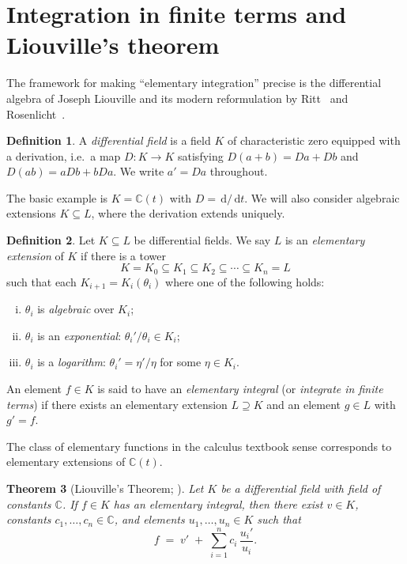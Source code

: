 \documentclass[11pt,a4paper]{article}
\theoremstyle{plain}
\newtheorem{theorem}{Theorem}[section]
\theoremstyle{definition}
\newtheorem{definition}[theorem]{Definition}
\theoremstyle{remark}
\newcommand{\C}{\mathbb{C}}
\renewcommand{\d}{\,\mathrm{d}}
\begin{document}
\section{Integration in finite terms and Liouville's theorem}
\label{sec:liouville}

The framework for making ``elementary integration'' precise is the differential algebra of Joseph Liouville and its modern reformulation by Ritt~\cite{Ritt1948} and Rosenlicht~\cite{Rosenlicht1972}.

\begin{definition}\label{def:diffield}
A \emph{differential field} is a field $K$ of characteristic zero equipped with a derivation, i.e.\ a map $D \colon K \to K$ satisfying $D(a+b)=Da+Db$ and $D(ab)=aDb+bDa$. We write $a' = Da$ throughout.
\end{definition}

The basic example is $K = \C(t)$ with $D = \d/\d t$. We will also consider algebraic extensions $K\subseteq L$, where the derivation extends uniquely.

\begin{definition}\label{def:elementary}
Let $K\subseteq L$ be differential fields. We say $L$ is an \emph{elementary extension} of $K$ if there is a tower
\[
  K = K_0 \subseteq K_1 \subseteq K_2 \subseteq \cdots \subseteq K_n = L
\]
such that each $K_{i+1} = K_i(\theta_i)$ where one of the following holds:
\begin{enumerate}[(i)]
  \item $\theta_i$ is \emph{algebraic} over $K_i$;
  \item $\theta_i$ is an \emph{exponential}: $\theta_i'/\theta_i \in K_i$;
  \item $\theta_i$ is a \emph{logarithm}: $\theta_i' = \eta'/\eta$ for some $\eta \in K_i$.
\end{enumerate}
An element $f \in K$ is said to have an \emph{elementary integral} (or \emph{integrate in finite terms}) if there exists an elementary extension $L \supseteq K$ and an element $g\in L$ with $g' = f$.
\end{definition}

The class of elementary functions in the calculus textbook sense corresponds to elementary extensions of $\C(t)$.

\begin{theorem}[Liouville's Theorem; \cite{Rosenlicht1972}]\label{thm:liouville}
Let $K$ be a differential field with field of constants $\C$. If $f\in K$ has an elementary integral, then there exist $v\in K$, constants $c_1,\dots,c_n\in \C$, and elements $u_1,\dots,u_n \in K$ such that
\begin{equation}\label{eq:liouville}
  f \;=\; v' \;+\; \sum_{i=1}^n c_i\,\frac{u_i'}{u_i}.
\end{equation}
\end{theorem}
\end{document}
